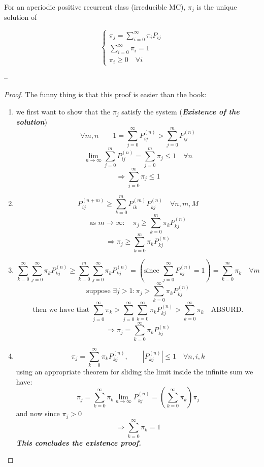 \begin{theorem}
For an aperiodic positive recurrent class (irreducible MC), $\pi_j$ is the unique solution of 

$$\begin{cases}
\pi_j = \sum_{i=0}^\infty \pi_i P_{ij} \\
\sum_{i=0}^\infty \pi_i = 1 \\
\pi_i \geq 0 \quad \forall i
\end{cases}$$
\end{theorem}
--
\begin{proof} The funny thing is that this proof is easier than the book:
\begin{enumerate}
\item we first want to show that the $\pi_j$ satisfy the system (\textbf{\textit{Existence of the solution}})
$$ \forall m,n \qquad 1=\sum_{j=0}^\infty P_{ij}^{(n)} > \sum_{j=0}^m P_{ij}^{(n)}$$
$$ \lim_{n\to\infty} \sum_{j=0}^m P_{ij}^{(n)} = \sum_{j=0}^m \pi_j \leq 1 \quad \forall n $$
\begin{equation}
\Rightarrow \sum_{j=0}^\infty \pi_j \leq 1
\end{equation}

\item
$$P_{ij}^{(n+m)} \geq \sum_{k=0}^m P_{ik}^{(m)} P_{kj}^{(n)} \quad \forall n, m, M$$
$$ \mbox{as } m \to \infty :\quad \pi_j \geq \sum_{k=0}^m \pi_k P_{kj}^{(n)} $$
\begin{equation}
\Rightarrow  \pi_j \geq \sum_{k=0}^m \pi_k P_{kj}^{(n)}
\end{equation}

\item
$$  \sum_{k=0}^\infty \sum_{j=0}^\infty \pi_k P_{kj}^{(n)} \geq 
      \sum_{k=0}^m \sum_{j=0}^\infty \pi_k P_{kj}^{(n)}  = 
      (\mbox{since } \sum_{j=0}^\infty P_{kj}^{(n)} = 1 ) =
      \sum_{k=0}^m \pi_k \quad \forall m $$
$$ \mbox{suppose } \exists j > 1 : \pi_j > \sum_{k=0}^\infty \pi_k P_{kj}^{(n)} $$
$$ \mbox{then we have that } \sum_{j=0}^\infty \pi_k > \sum_{j=0}^\infty \sum_{k=0}^\infty \pi_k P_{kj}^{(n)} > \sum_{k=0}^\infty \pi_k \quad \mbox{ABSURD.} $$ 
\begin{equation}
\Rightarrow \pi_j = \sum_{k=0}^\infty \pi_k P_{kj}^{(n)}
\end{equation}

\item
$$ \pi_j = \sum_{k=0}^\infty \pi_k P_{kj}^{(n)}, \qquad |P_{kj}^{(n)}| \leq 1 \quad \forall n,i,k $$
using an appropriate theorem for sliding the limit inside the infinite sum we have:
$$\pi_j = \sum_{k=0}^\infty  \pi_k \lim_{n\to\infty} P_{kj}^{(n)} = (\sum_{k=0}^\infty \pi_k) \pi_j$$
and now since $\pi_j>0$
\begin{equation}
\Rightarrow \sum_{k=0}^\infty \pi_k = 1
\end{equation}
\textbf{\textit{This concludes the existence proof.}}


\end{enumerate}
\end{proof}
